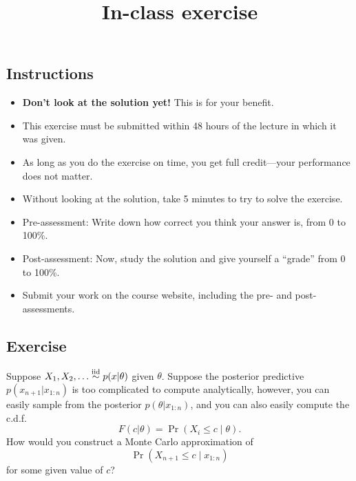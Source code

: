\documentclass[12pt]{article}
\title{In-class exercise}
\author{}
\date{}
\begin{document}
\maketitle

\subsection*{Instructions}
\begin{itemize}
\item \textbf{Don't look at the solution yet!} This is for your benefit.
\item This exercise must be submitted within 48 hours of the lecture in which it was given. 
\item As long as you do the exercise on time, you get full credit---your performance does not matter.
\item Without looking at the solution, take 5 minutes to try to solve the exercise.
\item Pre-assessment: Write down how correct you think your answer is, from 0 to 100\%.
\item Post-assessment: Now, study the solution and give yourself a ``grade'' from 0 to 100\%.
\item Submit your work on the course website, including the pre- and post- assessments.
\end{itemize}

\subsection*{Exercise}
Suppose $X_1,X_2,\dotsc\stackrel{\mathrm{iid}}{\sim} p(x|\theta)$ given $\theta$.  Suppose the posterior predictive $p(x_{n+1}|x_{1:n})$ is too complicated to compute analytically, however, you can easily sample from the posterior $p(\theta|x_{1:n})$, and you can also easily compute the c.d.f.\
$$F(c|\theta) = \Pr(X_i\leq c\mid \theta).$$
How would you construct a Monte Carlo approximation of
$$\Pr(X_{n+1}\leq c\mid x_{1:n})$$
for some given value of $c$?
\end{document}
